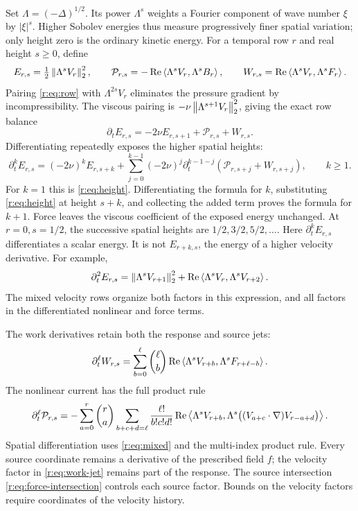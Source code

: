 Set \(\Lambda=(-\Delta)^{1/2}\). Its power \(\Lambda^s\) weights a
Fourier component of wave number \(\xi\) by \(|\xi|^s\). Higher
Sobolev energies thus measure progressively finer spatial variation;
only height zero is the ordinary kinetic energy. For a temporal row
\(r\) and real height \(s\ge0\), define
\[
 E_{r,s}=\tfrac12\left\lVert \Lambda^sV_r\right\rVert_2^2,\qquad
 \mathcal P_{r,s}=-\operatorname{Re}\left\langle \Lambda^sV_r,\Lambda^sB_r\right\rangle,
 \qquad
 W_{r,s}=\operatorname{Re}\left\langle \Lambda^sV_r,\Lambda^sF_r\right\rangle.
\]
Pairing \eqref{r:eq:row} with \(\Lambda^{2s}V_r\) eliminates the pressure
gradient by incompressibility. The viscous pairing is
\(-\nu\left\lVert \Lambda^{s+1}V_r\right\rVert_2^2\), giving the exact row balance
\begin{equation}
 \partial_tE_{r,s}=-2\nu E_{r,s+1}+\mathcal P_{r,s}+W_{r,s}.
 \label{r:eq:height}
\end{equation}
Differentiating repeatedly exposes the higher spatial heights:
\begin{equation}
 \partial_t^kE_{r,s}=(-2\nu)^kE_{r,s+k}
 +\sum_{j=0}^{k-1}(-2\nu)^j\partial_t^{k-1-j}
       (\mathcal P_{r,s+j}+W_{r,s+j}),\qquad k\ge1.
 \label{r:eq:completed}
\end{equation}
For \(k=1\) this is \eqref{r:eq:height}. Differentiating the formula for
\(k\), substituting \eqref{r:eq:height} at height \(s+k\), and collecting
the added term proves the formula for \(k+1\). Force leaves the viscous
coefficient of the exposed energy unchanged. At \(r=0,s=1/2\), the
successive spatial heights are \(1/2,3/2,5/2,\ldots\).
Here \(\partial_t^kE_{r,s}\) differentiates a scalar energy. It is not
\(E_{r+k,s}\), the energy of a higher velocity derivative. For example,
\[
 \partial_t^2E_{r,s}
 =\left\lVert \Lambda^sV_{r+1}\right\rVert_2^2
 +\operatorname{Re}\left\langle \Lambda^sV_r,\Lambda^sV_{r+2}\right\rangle.
\]
The mixed velocity rows organize both factors in this expression, and all
factors in the differentiated nonlinear and force terms.

The work derivatives retain both the response and source jets:
\begin{equation}
 \partial_t^\ell W_{r,s}
 =\sum_{b=0}^\ell\binom\ell b
 \operatorname{Re}\left\langle \Lambda^sV_{r+b},\Lambda^sF_{r+\ell-b}\right\rangle.
 \label{r:eq:work-jet}
\end{equation}
The nonlinear current has the full product rule
\begin{equation}
 \partial_t^\ell\mathcal P_{r,s}
 =-\sum_{a=0}^r\binom ra
 \sum_{b+c+d=\ell}\frac{\ell!}{b!c!d!}
 \operatorname{Re}\left\langle \Lambda^sV_{r+b},\Lambda^s\bigl((V_{a+c}\cdot\nabla)V_{r-a+d}\bigr)\right\rangle.
 \label{r:eq:production-jet}
\end{equation}
Spatial differentiation uses \eqref{r:eq:mixed} and the multi-index product
rule. Every source coordinate remains a derivative of the prescribed field
\(f\); the velocity factor in \eqref{r:eq:work-jet} remains part of the
response. The source intersection \eqref{r:eq:force-intersection} controls each source factor. Bounds on the velocity factors require coordinates of the velocity history.

